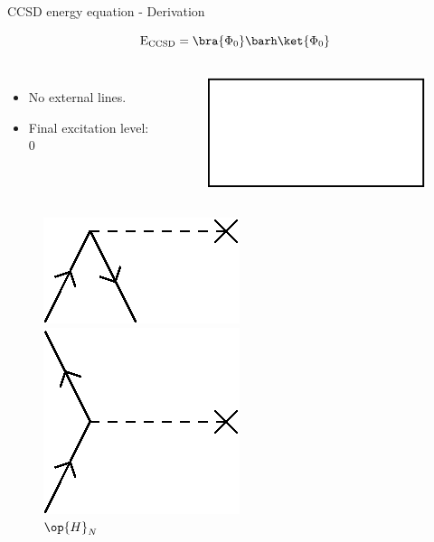     
\begin{frame}{CCSD energy equation - Derivation }

    \begin{equation*}
        \mathrm{E}_{\mathrm{CCSD}} = \bra{\Phi_0} \barh \ket{\Phi_0}
    \end{equation*}
    \begin{columns}
    \begin{itemize}
        \item No external lines.
        \item Final excitation level: 0 
    \end{itemize}
    \begin{figure}
        \centering
        \includegraphics[scale=0.65]{graphics/energy_diag}
    \end{figure}
    \end{columns}
    \renewcommand{\figurename}{Elements}
    \begin{columns}[t]
    \begin{figure}
        \caption{$\op{H}_N$}
        \centering
        \parbox{0.20\textwidth}{
            \centering
            \includegraphics[scale=0.35]{graphics/f1}} 
        \parbox{0.20\textwidth}{
            \centering
            \includegraphics[scale=0.35]{graphics/f2}} 

\end{figure}
\end{columns}
\end{frame}
